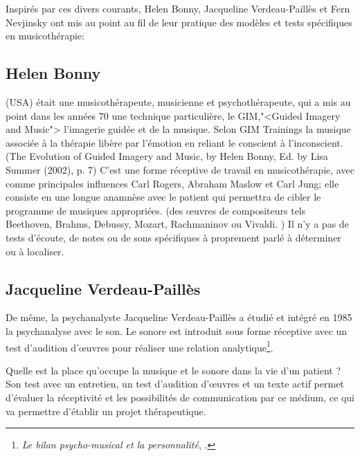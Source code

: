 	
Inspirés par ces divers courants, Helen Bonny, Jacqueline Verdeau-Paillès et Fern Nevjinsky ont  mis au point au fil de leur pratique des modèles et tests spécifiques en musicothérapie:


\subsection{Helen Bonny} (USA) était une musicothérapeute,
musicienne et psychothérapeute, qui a mis au point dans les années 70
une technique particulière, le GIM,"<Guided Imagery and Music">
l'imagerie guidée et de la musique. Selon GIM
Trainings\autocite{gim_site} la
musique associée à la thérapie libère par l'émotion en reliant le
conscient à l'inconscient.(The Evolution of Guided Imagery and Music, by Helen Bonny, Ed. by Lisa Summer (2002), p. 7)
 C'est une forme réceptive de travail
en musicothérapie, avec comme principales influences Carl Rogers, Abraham Maslow et Carl Jung; elle  consiste en une longue anamnèse avec le
patient qui permettra de cibler le programme de musiques appropriées. 
(des \oe uvres de compositeurs tels Beethoven, Brahms, Debussy,
Mozart, Rachmaninov ou Vivaldi. )
Il n'y a  pas de
tests d'écoute, de notes ou de sons spécifiques à proprement parlé à déterminer ou à localiser.

\subsection{Jacqueline Verdeau-Paillès}

 De même, la psychanalyste Jacqueline Verdeau-Paillès a étudié
 et
intégré en 1985 la psychanalyse avec le son.  Le sonore est  introduit
sous forme réceptive avec un test d'audition d'\oe uvres pour réaliser
une relation analytique\footnote{\textsl{Le bilan psycho-musical et la
    personnalité}, \cite{verdeau-pailles:bilan}.}.

Quelle est la place qu'occupe la musique et le sonore dans la vie d'un patient ? Son test avec un entretien, un test d'audition d'\oe uvres et un texte actif permet d'évaluer la réceptivité et les possibilités de communication par ce médium, ce qui va permettre d'établir un projet thérapeutique.

